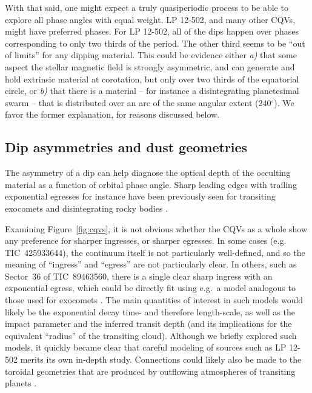 \documentclass[11pt,twocolumn,tighten]{aastex63}
\begin{document}
With that said, one might expect a truly quasiperiodic process to be
able to explore all phase angles with equal weight.  LP 12-502, and
many other CQVs, might have preferred phases.  For LP 12-502, all of
the dips happen over phases corresponding to only two thirds of the
period.  The other third seems to be ``out of limits'' for any dipping
material.  This could be evidence either {\it a)} that some aspect the
stellar magnetic field is strongly asymmetric, and can generate and
hold extrinsic material at corotation, but only over two thirds of the
equatorial circle, or {\it b)} that there is a material -- for
instance a disintegrating planetesimal swarm -- that is distributed
over an arc of the same angular extent (240$^\circ$).  We favor the
former explanation, for reasons discussed below.

\subsection{Dip asymmetries and dust geometries}
The asymmetry of a dip can help diagnose the optical depth of the
occulting material as a function of orbital phase angle.  Sharp
leading edges with trailing exponential egresses for instance have
been previously seen for transiting exocomets and disintegrating rocky
bodies
\citep[e.g.][]{2012ApJ...752....1R,2012A&A...545L...5B,2015Natur.526..546V,2019A&A...625L..13Z}.

Examining Figure~\ref{fig:cqvs}, it is not obvious
whether the CQVs as a whole show any preference for sharper ingresses,
or sharper egresses.
In some cases (e.g. TIC~425933644), the continuum itself is not
particularly well-defined, and so the meaning of ``ingress'' and
``egress'' are not particularly clear.
In others, such as Sector~36 of TIC~89463560, there is a single clear
sharp ingress with an exponential egress, which could be directly fit
using e.g.~a model analogous to those used for exocomets
\citep[e.g.][]{2019A&A...625L..13Z}.
The main quantities of interest in such models would likely be 
the exponential decay time- and therefore length-scale,
as well as the impact parameter and the 
inferred transit depth (and its implications for the equivalent
``radius'' of the transiting cloud).
Although we briefly explored such models, it quickly became clear that
careful modeling of sources such as LP 12-502 merits its own in-depth study.
Connections could likely also be made to the toroidal geometries that
are produced by outflowing atmospheres of transiting planets
\citep[e.g.][]{2019ApJ...873...89M,2022ApJ...926..226M}.
\end{document}
